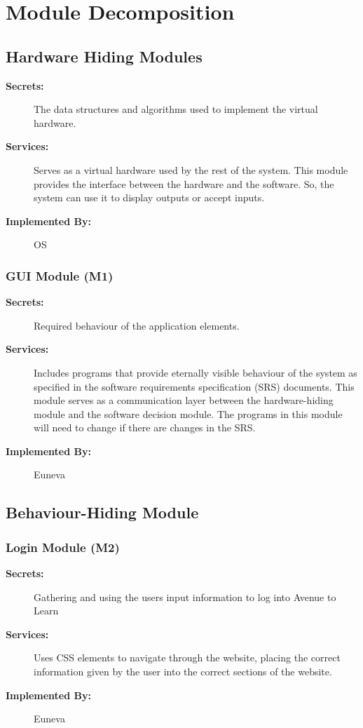 \documentclass[12pt, titlepage]{article}
\begin{document}
\section{Module Decomposition}
\subsection{Hardware Hiding Modules}
\begin{description}
    \item[\textbf{Secrets:}] The data structures and algorithms used to implement the virtual hardware.
    \item[\textbf{Services:}] Serves as a virtual hardware used by the rest of the system. This module provides the interface between the hardware and the software. So, the system can use it to display outputs or accept inputs.
    \item[\textbf{Implemented By:}] OS
\end{description}

\subsubsection{GUI Module (M1)}
\begin{description}
    \item[\textbf{Secrets:}] Required behaviour of the application elements.
    \item[\textbf{Services:}] Includes programs that provide eternally visible behaviour of the system as specified in the software requirements specification (SRS) documents. This module serves as a communication layer between the hardware-hiding  module and the software decision module. The programs in this module will need to change if there are changes in the SRS.
    \item[\textbf{Implemented By:}] Euneva
\end{description}

\subsection{Behaviour-Hiding Module}
\subsubsection{Login Module (M2)}
\begin{description}
    \item[\textbf{Secrets:}] Gathering and using the users input information to log into Avenue to Learn
    \item[\textbf{Services:}] Uses CSS elements to navigate through the website, placing the correct information given by the user into the correct sections of the website.
    \item[\textbf{Implemented By:}] Euneva
\end{description}
\end{document}
